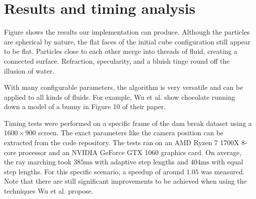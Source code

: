 %
\chapter{Results and timing analysis}
\label{sec:results}


Figure  shows the results our implementation can produce. Although the particles are spherical by nature, the flat faces of the initial cube configuration still appear to be flat. Particles close to each other merge into threads of fluid, creating a connected surface. Refraction, specularity, and a bluish tinge round off the illusion of water.

With many configurable parameters, the algorithm is very versatile and can be applied to all kinds of fluids. For example, Wu et al. show chocolate running down a model of a bunny in Figure 10 of their paper.

Timing tests were performed on a specific frame of the dam break dataset using a $1600 \times 900$ screen. The exact parameters like the camera position can be extracted from the code repository. The tests ran on an AMD Ryzen 7 1700X 8-core processor and an NVIDIA GeForce GTX 1060 graphics card. On average, the ray marching took $385\text{ms}$ with adaptive step lengths and $404\text{ms}$ with equal step lengths. For this specific scenario, a speedup of around $1.05$ was measured. Note that there are still significant improvements to be achieved when using the techniques Wu et al. propose.
